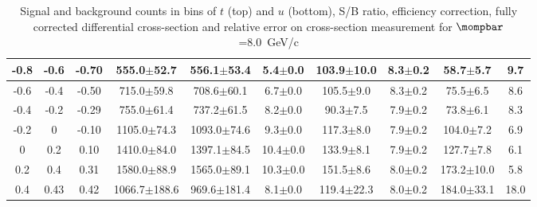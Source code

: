 \begin{landscape}
\begin{table}[hbpt]
\begin{center}
\begin{tabular}{|c|c|c|c|c|c|c|c|c|c|}
 \hline 
 -0.8 & -0.6 & -0.70 & 555.0$\pm$52.7 &  556.1$\pm$53.4 &  5.4$\pm$0.0 &  103.9$\pm$10.0 & 8.3$\pm$0.2 &  58.7$\pm$5.7 & 9.7 \\ 
 \hline 
 -0.6 & -0.4 & -0.50 & 715.0$\pm$59.8 &  708.6$\pm$60.1 &  6.7$\pm$0.0 &  105.5$\pm$9.0 & 8.3$\pm$0.2 &  75.5$\pm$6.5 & 8.6 \\ 
 \hline 
 -0.4 & -0.2 & -0.29 & 755.0$\pm$61.4 &  737.2$\pm$61.5 &  8.2$\pm$0.0 &  90.3$\pm$7.5 & 7.9$\pm$0.2 &  73.8$\pm$6.1 & 8.3 \\ 
 \hline 
 -0.2 & 0 & -0.10 & 1105.0$\pm$74.3 &  1093.0$\pm$74.6 &  9.3$\pm$0.0 &  117.3$\pm$8.0 & 7.9$\pm$0.2 &  104.0$\pm$7.2 & 6.9 \\ 
 \hline 
 0 & 0.2 & 0.10 & 1410.0$\pm$84.0 &  1397.1$\pm$84.5 &  10.4$\pm$0.0 &  133.9$\pm$8.1 & 7.9$\pm$0.2 &  127.7$\pm$7.8 & 6.1 \\ 
 \hline 
 0.2 & 0.4 & 0.31 & 1580.0$\pm$88.9 &  1565.0$\pm$89.1 &  10.3$\pm$0.0 &  151.5$\pm$8.6 & 8.0$\pm$0.2 &  173.2$\pm$10.0 & 5.8 \\ 
 \hline 
 0.4 & 0.43 & 0.42 & 1066.7$\pm$188.6 &  969.6$\pm$181.4 &  8.1$\pm$0.0 &  119.4$\pm$22.3 & 8.0$\pm$0.2 &  184.0$\pm$33.1 & 18.0 \\ 
 \hline 
    \end{tabular}
\caption{Signal and background counts in bins of $t$ (top) and $u$
         (bottom), S/B ratio, efficiency correction, fully corrected
         differential cross-section and relative error on cross-section
         measurement for $\mompbar$=8.0~GeV/c}
  \end{center}
\end{table}
\end{landscape}
